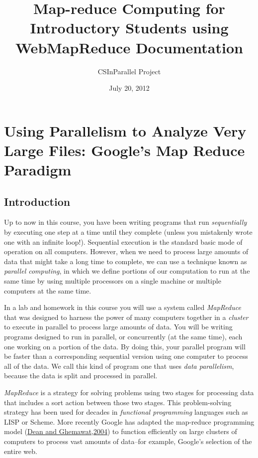 \documentclass[letterpaper,10pt,openany,oneside]{sphinxmanual}
\title{Map-reduce Computing for Introductory Students using WebMapReduce Documentation}
\date{July 20, 2012}
\author{CSInParallel Project}
\begin{document}
\maketitle
\tableofcontents
{}\label{index::doc}



\chapter{Using Parallelism to Analyze Very Large Files: Google's Map Reduce Paradigm}
\label{MapReduceIntro/MapReduceIntro:map-reduce-computing-for-introductory-students-using-webmapreduce}\label{MapReduceIntro/MapReduceIntro::doc}\label{MapReduceIntro/MapReduceIntro:using-parallelism-to-analyze-very-large-files-google-s-map-reduce-paradigm}

\section{Introduction}
\label{MapReduceIntro/MapReduceIntro:introduction}
Up to now in this course, you have been writing programs that run
\emph{sequentially} by executing one step at a time until they complete
(unless you mistakenly wrote one with an infinite loop!).
Sequential execution is the standard basic mode of operation on all
computers. However, when we need to process large amounts of data
that might take a long time to complete, we can use a technique
known as \emph{parallel computing}, in which we define portions of our
computation to run at the same time by using multiple processors on
a single machine or multiple computers at the same time.

In a lab and homework in this course you will use a system called
\emph{MapReduce} that was designed to harness the power of many
computers together in a \emph{cluster} to execute in parallel to process
large amounts of data. You will be writing programs designed to run
in parallel, or concurrently (at the same time), each one working
on a portion of the data. By doing this, your parallel program will
be faster than a corresponding sequential version using one
computer to process all of the data. We call this kind of program
one that uses \emph{data parallelism}, because the data is split and
processed in parallel.

\emph{MapReduce} is a strategy for solving problems using two stages for
processing data that includes a sort action between those two
stages. This problem-solving strategy has been used for decades in
\emph{functional programming} languages such as LISP or Scheme. More
recently Google has adapted the map-reduce programming model
(\href{http://labs.google.com/papers/mapreduce.html}{Dean and Ghemawat,2004})
to function efficiently on large clusters of computers to process
vast amounts of data--for example, Google's selection of the entire
web.
\end{document}
